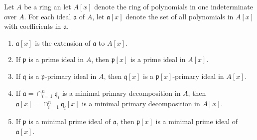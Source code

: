 \begin{exercise}
	Let $A$ be a ring an let $A[x] $ denote the ring of polynomials in one indeterminate over $A $. For each ideal $\mathfrak{a} $ of $A $, let $\mathfrak{a}[x] $ denote the set of all polynomials in $A[x] $ with coefficients in $\mathfrak{a} $.
	\begin{enumerate}
		\item $\mathfrak{a}[x]$ is the extension of $\mathfrak{a}$ to $A[x]$.
		\item If $\mathfrak{p}$ is a prime ideal in $A$, then $\mathfrak{p}[x]$ is a prime ideal in $A[x]$.
		\item If $\mathfrak{q}$ is a $\mathfrak{p}$-primary ideal in $A$, then $\mathfrak{q}[x]$ is a $\mathfrak{p}[x]$-primary ideal in $A[x]$.
		\item If $\mathfrak{a} = \cap_{i=1}^n \mathfrak{q}_i$ is a minimal primary decomposition in $A$, then $\mathfrak{a}[x] = \cap_{i=1}^n \mathfrak{q}_i[x]$ is a minimal primary decomposition in $A[x]$.
		\item If $\mathfrak{p}$ is a minimal prime ideal of $\mathfrak{a}$, then $\mathfrak{p}[x]$ is a minimal prime ideal of $\mathfrak{a}[x]$.
	\end{enumerate}
\end{exercise}
